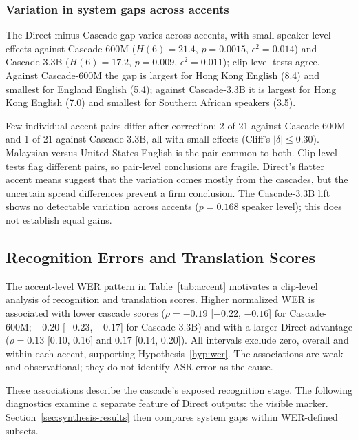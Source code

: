 \subsubsection{Variation in system gaps across accents}
\label{sec:statistical-accent-gap-variation}
The Direct-minus-Cascade gap varies across accents, with small speaker-level
effects against Cascade-600M ($H(6)=21.4$, $p=0.0015$, $\epsilon^2=0.014$)
and Cascade-3.3B ($H(6)=17.2$, $p=0.009$, $\epsilon^2=0.011$); clip-level
tests agree. Against Cascade-600M the gap is largest for Hong Kong English
(8.4) and smallest for England English (5.4); against Cascade-3.3B it is
largest for Hong Kong English (7.0) and smallest for Southern African
speakers (3.5).

Few individual accent pairs differ after correction: 2 of 21 against
Cascade-600M and 1 of 21 against Cascade-3.3B, all with small effects
(Cliff's $|\delta|\le 0.30$). Malaysian versus United States English is the
pair common to both. Clip-level tests flag different pairs, so pair-level
conclusions are fragile. Direct's flatter accent means suggest that the
variation comes mostly from the cascades, but the uncertain spread differences
prevent a firm conclusion. The Cascade-3.3B lift shows no detectable variation
across accents ($p=0.168$ speaker level); this does not establish equal gains.

\subsection{Recognition Errors and Translation Scores}
\label{sec:statistical-asr-associations}
The accent-level WER pattern in Table~\ref{tab:accent} motivates a clip-level
analysis of recognition and translation scores. Higher normalized WER is
associated with lower cascade scores ($\rho=-0.19$ [$-0.22$, $-0.16$] for
Cascade-600M; $-0.20$ [$-0.23$, $-0.17$] for Cascade-3.3B) and with a larger
Direct advantage ($\rho=0.13$ [0.10, 0.16] and $0.17$ [0.14, 0.20]). All
intervals exclude zero, overall and within each accent, supporting
Hypothesis~\ref{hyp:wer}. The associations are weak and observational;
they do not identify ASR error as the cause.

These associations describe the cascade's exposed recognition stage. The
following diagnostics examine a separate feature of Direct outputs: the
visible \unk{} marker. Section~\ref{sec:synthesis-results} then compares
system gaps within WER-defined subsets.
